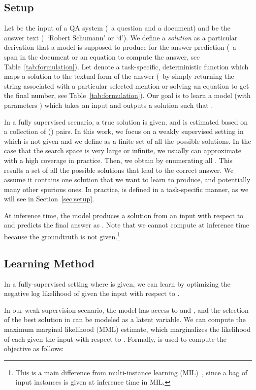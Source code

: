 \documentclass[11pt,a4paper]{article}
\begin{document}
\subsection{Setup}
Let  be the input of a QA system (\eg\ a question and a document) and  be the answer text (\eg\ `Robert Schumann' or `4').
We define a {\em solution} as a particular derivation that a model is supposed to produce for the answer prediction (\eg\ a span in the document or an equation to compute the  answer, see Table~\ref{tab:formulation}).
Let  denote a task-specific, deterministic function which maps a solution to the textual form of the answer (\eg\ by simply returning the string associated with a particular selected mention or solving an equation to get the final number, see Table~\ref{tab:formulation}). Our goal is to learn a model (with parameters ) which takes an input  and outputs a solution  such that .

In a fully supervised scenario, a true solution  is given, and  is estimated based on a collection of () pairs. In this work, we focus on a weakly supervised setting in which  is not given and we define  as a finite set of all the possible solutions. In the case that the search space is very large or infinite, we usually can approximate  with a high coverage in practice. Then, we obtain  by enumerating all .
This results a set of all the possible solutions that lead to the correct answer. We assume it contains one solution that we want to learn to produce, and potentially many other spurious ones. In practice,  is defined in a task-specific manner, as we will see in Section~\ref{sec:setup}.


At inference time, the model produces a solution  from an input  with respect to  and predicts the final answer as .
Note that we cannot compute  at inference time because the groundtruth  is not given.\footnote{
    This is a main difference from multi-instance learning (MIL)~\citep{multiinstancelearning}, since a bag of input instances is given at inference time in MIL.
}



\subsection{Learning Method}
In a fully-supervised setting where  is given, we can learn  by optimizing the negative log likelihood of  given the input  with respect to .

In our weak supervision scenario, the model has access to  and , and the selection of the best solution in  can be modeled as a latent variable. We can compute the maximum marginal likelihood (MML) estimate, which marginalizes the likelihood of each  given the input  with respect to . Formally,  is used to compute the objective as follows:
\end{document}
